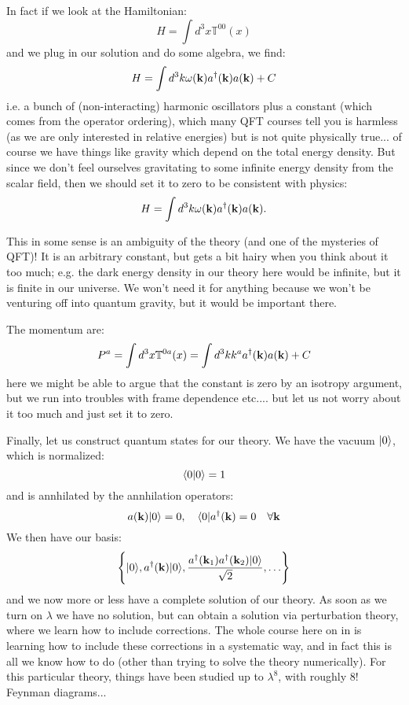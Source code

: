 In fact if we look at the Hamiltonian:
\begin{equation}
    H = \int d^3x \mathbb{T}^{00}(x)
\end{equation}
and we plug in our solution and do some algebra, we find:
\begin{equation}
    H = \int d^3k \omega(\mathbf{k})a^\dagger(\mathbf{k})a(\mathbf{k}) + C
\end{equation}
i.e. a bunch of (non-interacting) harmonic oscillators plus a constant (which comes from the operator ordering), which many QFT courses tell you is harmless (as we are only interested in relative energies) but is not quite physically true... of course we have things like gravity which depend on the total energy density. But since we don't feel ourselves gravitating to some infinite energy density from the scalar field, then we should set it to zero to be consistent with physics:
\begin{equation}
    H = \int d^3k \omega(\mathbf{k})a^\dagger(\mathbf{k})a(\mathbf{k}).
\end{equation}

This in some sense is an ambiguity of the theory (and one of the mysteries of QFT)! It is an arbitrary constant, but gets a bit hairy when you think about it too much; e.g. the dark energy density in our theory here would be infinite, but it is finite in our universe. We won't need it for anything because we won't be venturing off into quantum gravity, but it would be important there.

The momentum are:
\begin{equation}
    P^a = \int d^3x \mathbb{T}^{0a}(x) = \int d^3k k^a a^\dagger(\mathbf{k})a(\mathbf{k}) + C
\end{equation}
here we might be able to argue that the constant is zero by an isotropy argument, but we run into troubles with frame dependence etc.... but let us not worry about it too much and just set it to zero.

Finally, let us construct quantum states for our theory. We have the vacuum $\lvert 0 \rangle$, which is normalized:
\begin{equation}
    \langle 0 \lvert 0 \rangle = 1
\end{equation}
and is annhilated by the annhilation operators:
\begin{equation}
    a(\mathbf{k})\lvert 0 \rangle = 0, \quad \langle 0 \rvert a^\dagger(\mathbf{k}) = 0 \quad \forall \mathbf{k}
\end{equation}
We then have our basis:
\begin{equation}
    \set{\lvert 0 \rangle, a^\dagger(\ensuremath{\mathbf{k}})\lvert 0 \rangle, \frac{a^\dagger(\ensuremath{\mathbf{k}}_1)a^\dagger(\ensuremath{\mathbf{k}}_2)\lvert 0 \rangle}{\sqrt{2}}, \ldots }
\end{equation}
and we now more or less have a complete solution of our theory. As soon as we turn on $\lambda$ we have no solution, but can obtain a solution via perturbation theory, where we learn how to include corrections. The whole course here on in is learning how to include these corrections in a systematic way, and in fact this is all we know how to do (other than trying to solve the theory numerically). For this particular theory, things have been studied up to $\lambda^8$, with roughly $8!$ Feynman diagrams...